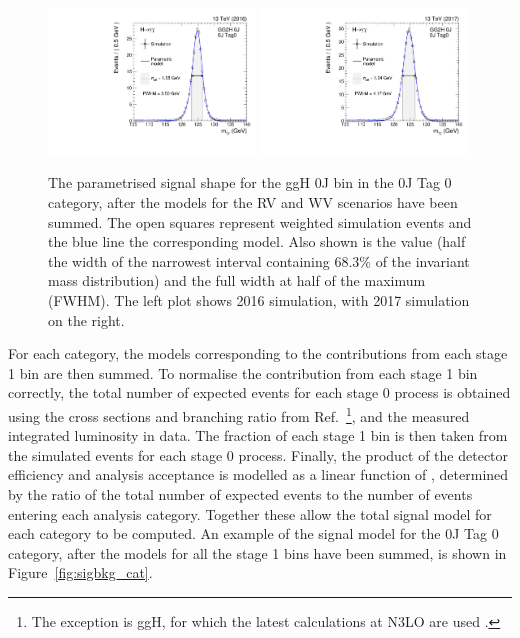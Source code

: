 \begin{figure}[hptb]
  \centering
  \includegraphics[width=0.49\textwidth]{Figures/SigBkg/GG2H_0J_RECO_0J_Tag0_2016.pdf}
  \includegraphics[width=0.49\textwidth]{Figures/SigBkg/GG2H_0J_RECO_0J_Tag0_2017.pdf}
  \caption[Signal model for the ggH 0J bin in the 0J Tag 0 category.]
  {
    The parametrised signal shape for the ggH 0J bin in the 0J Tag 0 category, 
    after the models for the RV and WV scenarios have been summed.
    The open squares represent weighted simulation events and the blue line the
    corresponding model. Also shown is the \seff value (half the width of the narrowest interval
    containing 68.3\% of the invariant mass distribution) and the full width at half of the maximum
    (FWHM). The left plot shows 2016 simulation, with 2017 simulation on the right.
  }
  \label{fig:sigbkg_proccat}
\end{figure}

For each category, 
the models corresponding to the contributions from each stage 1 bin are then summed.
To normalise the contribution from each stage 1 bin correctly, 
the total number of expected events for each stage 0 process is obtained 
using the cross sections and \Hgg branching ratio from Ref.~\cite{YR4}\footnote{The exception is ggH, 
for which the latest calculations at N3LO are used \cite{Anastasiou2015,Anastasiou2016}.},
and the measured integrated luminosity in data.
The fraction of each stage 1 bin is then taken from the simulated events for each stage 0 process.
Finally, the product of the detector efficiency and analysis acceptance 
is modelled as a linear function of \mH, 
determined by the ratio of the total number of expected events 
to the number of events entering each analysis category.
Together these allow the total signal model for each category to be computed.
An example of the signal model for the 0J Tag 0 category, 
after the models for all the stage 1 bins have been summed, 
is shown in Figure~\ref{fig:sigbkg_cat}.

